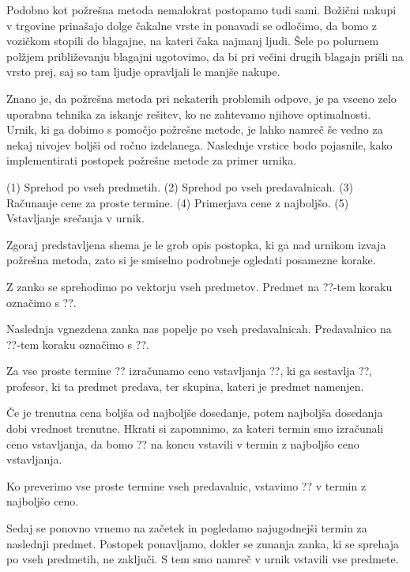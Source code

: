 \documentclass[a4paper,10pt]{article}
\begin{document}
Podobno kot požrešna metoda nemalokrat postopamo tudi sami. Božični nakupi v trgovine
prinašajo dolge čakalne vrste in ponavadi se odločimo, da bomo z vozičkom stopili do blagajne,
na kateri čaka najmanj ljudi. Šele po polurnem polžjem približevanju blagajni ugotovimo,
da bi pri večini drugih blagajn prišli na vrsto prej, saj so tam ljudje opravljali le
manjše nakupe.

Znano je, da požrešna metoda pri nekaterih problemih odpove, je pa vseeno zelo uporabna
tehnika za iskanje rešitev, ko ne zahtevamo njihove optimalnosti. Urnik, ki ga dobimo s
pomočjo požrešne metode, je lahko namreč še vedno za nekaj nivojev boljši od ročno izdelanega.
Naslednje vrstice bodo pojasnile, kako implementirati postopek požrešne metode za primer urnika.

(1) Sprehod po vseh predmetih.
{
   (2) Sprehod po vseh predavalnicah.
   {
      (3) Računanje cene za proste termine.
      (4) Primerjava cene z najboljšo.
   }
   (5) Vstavljanje srečanja v urnik.
}

Zgoraj predstavljena shema je le grob opis postopka, ki ga nad urnikom izvaja požrešna metoda,
zato si je smiselno podrobneje ogledati posamezne korake.

   Z zanko se sprehodimo po vektorju vseh predmetov. Predmet na ??-tem koraku
   označimo s ??.

   Naslednja vgnezdena zanka nas popelje po vseh predavalnicah. Predavalnico na
   ??-tem koraku označimo s ??.

   Za vse proste termine ?? izračunamo ceno vstavljanja
   ??, ki ga sestavlja ??, profesor, ki ta predmet predava,
   ter skupina, kateri je predmet namenjen.

   Če je trenutna cena boljša od najboljše dosedanje, potem najboljša dosedanja
   dobi vrednost trenutne. Hkrati si zapomnimo, za kateri termin smo izračunali ceno
   vstavljanja, da bomo ?? na koncu vstavili v termin z najboljšo
   ceno vstavljanja.

   Ko preverimo vse proste termine vseh predavalnic, vstavimo ??
   v termin z najboljšo ceno.

   Sedaj se ponovno vrnemo na začetek in pogledamo najugodnejši termin za naslednji
   predmet. Postopek ponavljamo, dokler se zunanja zanka, ki se sprehaja po vseh predmetih,
   ne zaključi. S tem smo namreč v urnik vstavili vse predmete.
\end{document}
